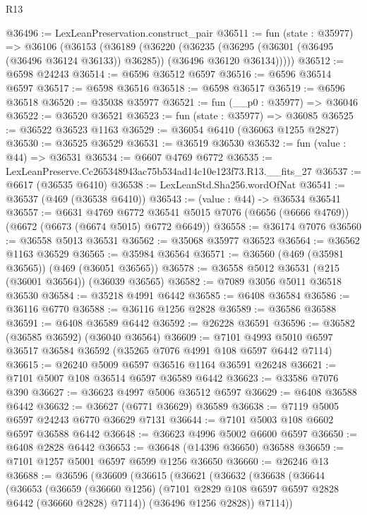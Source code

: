 \begin{lexlean}{R13}
\begin{coremodule}
@36496 := LexLeanPreservation.construct_pair
@36511 := fun (state : @35977) =>
  @36106
    (@36153
      (@36189
        (@36220
          (@36235
            (@36295 (@36301 (@36495 (@36496 @36124 @36133)) @36285))
            (@36496 @36120 @36134)))))
@36512 := @6598 @24243
@36514 := @6596 @36512 @6597
@36516 := @6596 @36514 @6597
@36517 := @6598 @36516
@36518 := @6598 @36517
@36519 := @6596 @36518
@36520 := @35038 @35977
@36521 := fun (__p0 : @35977) => @36046
@36522 := @36520 @36521
@36523 := fun (state : @35977) => @36085
@36525 := @36522 @36523 @1163
@36529 := @36054 @6410 (@36063 @1255 @2827)
@36530 := @36525 @36529
@36531 := @36519 @36530
@36532 := fun (value : @44) => @36531
@36534 := @6607 @4769 @6772
@36535 := LexLeanPreserve.Cc265348943ac75b534ad14c10e123f73.R13.__fits_27
@36537 := @6617 (@36535 @6410)
@36538 := LexLeanStd.Sha256.wordOfNat
@36541 := @36537 (@469 (@36538 @6410))
@36543 := (value : @44) -> @36534 @36541
@36557 := @6631
    @4769
    @6772
    @36541
    @5015
    @7076
    (@6656 (@6666 @4769))
    (@6672 (@6673 (@6674 @5015) @6772 @6649))
@36558 := @36174 @7076
@36560 := @36558 @5013 @36531
@36562 := @35068 @35977 @36523
@36564 := @36562 @1163 @36529
@36565 := @35984 @36564
@36571 := @36560 (@469 (@35981 @36565)) (@469 (@36051 @36565))
@36578 := @36558 @5012 @36531 (@215 (@36001 @36564)) (@36039 @36565)
@36582 := @7089 @3056 @5011 @36518 @36530
@36584 := @35218 @4991 @6442
@36585 := @6408 @36584
@36586 := @36116 @6770
@36588 := @36116 @1256 @2828
@36589 := @36586 @36588
@36591 := @6408 @36589 @6442
@36592 := @26228 @36591
@36596 := @36582 (@36585 @36592) (@36040 @36564)
@36609 := @7101 @4993 @5010 @6597 @36517 @36584 @36592 (@35265 @7076 @4991 @108 @6597 @6442 @7114)
@36615 := @26240 @5009 @6597 @36516 @1164 @36591 @26248
@36621 := @7101 @5007 @108 @36514 @6597 @36589 @6442
@36623 := @33586 @7076 @390
@36627 := @36623 @4997 @5006 @36512 @6597
@36629 := @6408 @36588 @6442
@36632 := @36627 (@6771 @36629) @36589
@36638 := @7119 @5005 @6597 @24243 @6770 @36629 @7131
@36644 := @7101 @5003 @108 @6602 @6597 @36588 @6442
@36648 := @36623 @4996 @5002 @6600 @6597
@36650 := @6408 @2828 @6442
@36653 := @36648 (@14396 @36650) @36588
@36659 := @7101 @1257 @5001 @6597 @6599 @1256 @36650
@36660 := @26246 @13
@36688 := @36596
    (@36609
      (@36615
        (@36621
          (@36632
            (@36638
              (@36644
                (@36653
                  (@36659
                    (@36660 @1256)
                    (@7101 @2829 @108 @6597 @6597 @2828 @6442 (@36660 @2828) @7114))
                  (@36496 @1256 @2828))
                @7114))

\end{coremodule}
\end{lexlean}
